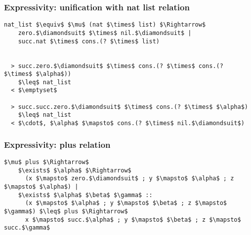 \documentclass{beamer}
\begin{document}
\begin{frame}[fragile]
  \frametitle{Expressivity: unification with nat list relation}

  \begin{lstlisting}[]
  nat_list $\equiv$ $\mu$ (nat $\times$ list) $\Rightarrow$ 
    zero.$\diamondsuit$ $\times$ nil.$\diamondsuit$ | 
    succ.nat $\times$ cons.(? $\times$ list)


  > succ.zero.$\diamondsuit$ $\times$ cons.(? $\times$ cons.(? $\times$ $\alpha$))
    $\leq$ nat_list
  < $\emptyset$

  > succ.succ.zero.$\diamondsuit$ $\times$ cons.(? $\times$ $\alpha$) 
    $\leq$ nat_list
  < $\cdot$, $\alpha$ $\mapsto$ cons.(? $\times$ nil.$\diamondsuit$)
  \end{lstlisting} 
\end{frame}


\begin{frame}[fragile]
  \frametitle{Expressivity: plus relation}

  \begin{lstlisting}[]
  $\mu$ plus $\Rightarrow$ 
    $\exists$ $\alpha$ $\Rightarrow$ 
      (x $\mapsto$ zero.$\diamondsuit$ ; y $\mapsto$ $\alpha$ ; z $\mapsto$ $\alpha$) |
    $\exists$ $\alpha$ $\beta$ $\gamma$ :: 
      (x $\mapsto$ $\alpha$ ; y $\mapsto$ $\beta$ ; z $\mapsto$ $\gamma$) $\leq$ plus $\Rightarrow$ 
      x $\mapsto$ succ.$\alpha$ ; y $\mapsto$ $\beta$ ; z $\mapsto$ succ.$\gamma$
  \end{lstlisting}
\end{frame}
\end{document}
